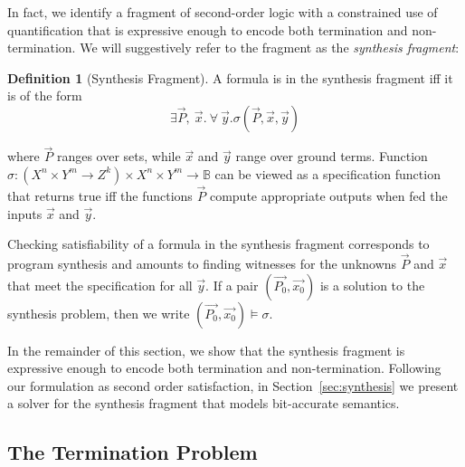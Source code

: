 \documentclass[preprint]{sigplanconf}
\theoremstyle{definition}
\newtheorem{definition}[theorem]{Definition}
\begin{document}
In fact, we identify a fragment of second-order logic with a constrained use of quantification that is expressive enough to encode both termination and non-termination.
We will suggestively refer to the fragment as the \emph{synthesis fragment}:


\begin{definition}[Synthesis Fragment]
 A formula is in the synthesis fragment iff it is of the form
 \[
  \exists \vec{P},~ \vec{x} . ~\forall~ \vec{y} . \sigma(\vec{P}, \vec{x}, \vec{y})
 \]

where $\vec{P}$ ranges over sets, while $\vec{x}$ and $\vec{y}$ range over ground terms.
Function $\sigma: (X^n \times Y^m \to Z^k) \times X^n \times Y^m  \to \mathbb{B}$ can be viewed as a specification function
that  returns true iff the functions $\vec{P}$ compute appropriate outputs
when fed the inputs $\vec{x}$ and $\vec{y}$.  
\end{definition}

Checking satisfiability of a formula in the synthesis fragment corresponds to program synthesis and
amounts to finding witnesses for the unknowns $\vec{P}$ and $\vec{x}$ that meet the specification
for all $\vec{y}$. 
If a pair $(\vec{P_0}, \vec{x_0})$ is a solution to the synthesis problem, then we write $(\vec{P_0}, \vec{x_0}) \models \sigma$.


In the remainder of this section, we show that the synthesis fragment 
is expressive enough to encode both termination and non-termination. %
Following our formulation as second order satisfaction, %
in Section~\ref{sec:synthesis} we present a solver for the synthesis fragment that models bit-accurate semantics. 


\subsection{The Termination Problem}
\end{document}
